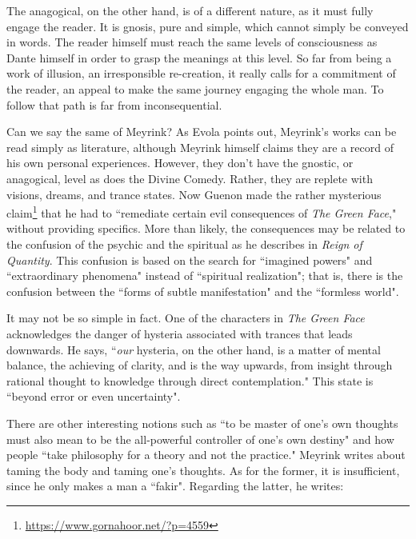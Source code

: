 The anagogical, on the other hand, is of a different nature, as it must fully engage the reader. It is gnosis, pure and simple, which cannot simply be conveyed in words. The reader himself must reach the same levels of consciousness as Dante himself in order to grasp the meanings at this level. So far from being a work of illusion, an irresponsible re-creation, it really calls for a commitment of the reader, an appeal to make the same journey engaging the whole man. To follow that path is far from inconsequential.

Can we say the same of Meyrink? As Evola points out, Meyrink's works can be read simply as literature, although Meyrink himself claims they are a record of his own personal experiences. However, they don't have the gnostic, or anagogical, level as does the Divine Comedy. Rather, they are replete with visions, dreams, and trance states. Now Guenon made the rather mysterious claim\footnote{\url{https://www.gornahoor.net/?p=4559}} that he had to ``remediate certain evil consequences of \emph{The Green Face}," without providing specifics. More than likely, the consequences may be related to the confusion of the psychic and the spiritual as he describes in \emph{Reign of Quantity}. This confusion is based on the search for ``imagined powers" and ``extraordinary phenomena" instead of ``spiritual realization"; that is, there is the confusion between the ``forms of subtle manifestation" and the ``formless world".

It may not be so simple in fact. One of the characters in \emph{The Green Face} acknowledges the danger of hysteria associated with trances that leads downwards. He says, ``\emph{our} hysteria, on the other hand, is a matter of mental balance, the achieving of clarity, and is the way upwards, from insight through rational thought to knowledge through direct contemplation." This state is ``beyond error or even uncertainty".

There are other interesting notions such as ``to be master of one's own thoughts must also mean to be the all-powerful controller of one's own destiny" and how people ``take philosophy for a theory and not the practice." Meyrink writes about taming the body and taming one's thoughts. As for the former, it is insufficient, since he only makes a man a ``fakir". Regarding the latter, he writes:

